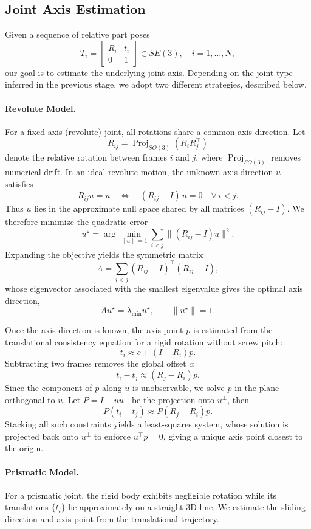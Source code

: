 \subsection{Joint Axis Estimation}
\label{sec:jointaxis}
Given a sequence of relative part poses 
\[
    T_i = 
    \begin{bmatrix}
        R_i & t_i\\
        0 & 1
    \end{bmatrix}
    \in SE(3), \quad i=1,\dots,N,
\]
our goal is to estimate the underlying joint axis.
Depending on the joint type inferred in the previous stage, we adopt two different strategies, described below.

\paragraph{Revolute Model.}
For a fixed-axis (revolute) joint, all rotations share a common axis direction.
Let 
\[
    R_{ij} = \operatorname{Proj}_{SO(3)}(R_i R_j^\top)
\]
denote the relative rotation between frames $i$ and $j$, where $\operatorname{Proj}_{SO(3)}$ removes numerical drift.
In an ideal revolute motion, the unknown axis direction $u$ satisfies
\[
    R_{ij} u = u
    \quad\Longleftrightarrow\quad
    (R_{ij}-I)\,u = 0
    \quad\forall\, i<j.
\]
Thus $u$ lies in the approximate null space shared by all matrices $(R_{ij}-I)$.
We therefore minimize the quadratic error
\[
    u^\star = 
    \arg\min_{\|u\|=1}
    \sum_{i<j}
        \|(R_{ij} - I)u\|^2.
\]
Expanding the objective yields the symmetric matrix
\[
    A = 
    \sum_{i<j}
        (R_{ij}-I)^\top (R_{ij}-I),
\]
whose eigenvector associated with the smallest eigenvalue gives the optimal axis direction,
\[
    A u^\star = \lambda_{\min} u^\star,
    \qquad \|u^\star\| = 1.
\]

Once the axis direction is known, the axis point $p$ is estimated from the translational consistency equation for a rigid rotation without screw pitch:
\[
    t_i \approx c + (I - R_i)p.
\]
Subtracting two frames removes the global offset $c$:
\[
    t_i - t_j \approx (R_j - R_i)p.
\]
Since the component of $p$ along $u$ is unobservable, we solve $p$ in the plane orthogonal to $u$.  
Let $P = I - u u^\top$ be the projection onto $u^\perp$, then
\[
    P(t_i - t_j) \approx P(R_j - R_i)p.
\]
Stacking all such constraints yields a least-squares system, whose solution is projected back onto $u^\perp$ to enforce $u^\top p = 0$, giving a unique axis point closest to the origin.

\paragraph{Prismatic Model.}
For a prismatic joint, the rigid body exhibits negligible rotation while its translations $\{t_i\}$ lie approximately on a straight 3D line.
We estimate the sliding direction and axis point from the translational trajectory.

